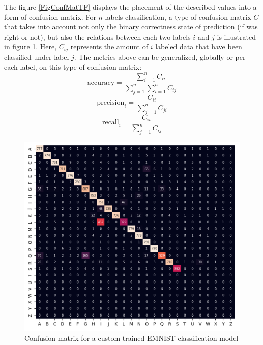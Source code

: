 The figure \ref{FigConfMatTF} displays the placement of the described values into a form of confusion matrix. For $n$-labels classification, a type of confusion matrix $C$ that takes into account not only the binary correctness state of prediction (if was right or not), but also the relations between each two labels $i$ and $j$ is illustrated in figure \ref{FigConfMatN}. Here, $C_{i j}$ represents the amount of ${i}$ labeled data that have been classified under label $j$. The metrics above can be generalized, globally or per each label, on this type of confusion matrix:
$$\mathrm{accuracy} = \frac{\sum_{i=1}^n{C_{i i}}}{\sum_{j=1}^n\sum_{i=1}^n{C_{i j}}}$$
$$\mathrm{precision}_i = \frac{C_{i i}}{\sum_{j=1}^n{C_{j i}}}$$
$$\mathrm{recall}_i = \frac{C_{i i}}{\sum_{j=1}^n{C_{i j}}}$$


\begin{figure}[htbp]
	\centering
	\includegraphics[scale=0.50]{figures/confmat_n.PNG}
	\caption{Confusion matrix for a custom trained EMNIST classification model}
	\label{FigConfMatN}
\end{figure}